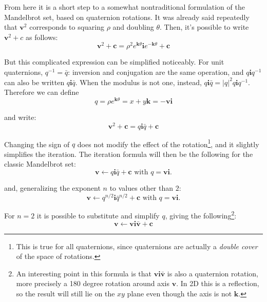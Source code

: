 \documentclass{article}
\let\vec\mathbf
\begin{document}
From here it is a short step to a somewhat nontraditional formulation of
the Mandelbrot set, based on quaternion rotations.  It was already said
repeatedly that $\vec{v}^2$ corresponds to squaring $\rho$ and doubling
$\theta$.  Then, it's possible to write $\vec{v}^2+c$ as follows:
\begin{equation*}
\vec{v}^2+\vec{c}=\rho^2 e^{\vec{k}\theta} \vec{i} e^{-\vec{k}\theta}+\vec{c}
\end{equation*}

But this complicated expression can be simplified noticeably.  For unit
quaternions, $q^{-1}=\bar q$: inversion and conjugation are the same
operation, and $q\vec{i}q^{-1}$ can also be written $q\vec{i}\bar
q$.  When the modulus is not one, instead, $q\vec{i}\bar q = |q|^2
q\vec{i}q^{-1}$.  Therefore we can define
\begin{equation*}
q = \rho e^{\vec{k}\theta} = x + y\vec{k} = -\vec{v}\vec{i}
\end{equation*}

\noindent
and write:
\begin{equation*}
\vec{v}^2+\vec{c}=q \vec{i} \bar q+\vec{c}
\end{equation*}

\noindent
Changing the sign of $q$ does not modify the effect of the
rotation\footnote{This is true for all quaternions, since quaternions
  are actually a \emph{double cover} of the space of rotations.}, and
it slightly simplifies the iteration.  The iteration formula will then be
the following for the classic Mandelbrot set:
\begin{equation*}
\vec{v}\leftarrow q \vec{i} \bar q+\vec{c}\text{ with }q=\vec{v}\vec{i}.
\end{equation*}

\noindent
and, generalizing the exponent $n$ to values other than $2$:
\begin{equation}
\label{eq:quat}
\vec{v}\leftarrow q^{n/2} \vec{i} \bar q^{n/2}+\vec{c}\text{ with }q=\vec{v}\vec{i}.
\end{equation}

\noindent
For $n=2$ it is possible to substitute and simplify $q$, giving
the following\footnote{An interesting point in this formula is that
  $\vec{v}\vec{i}\vec{\bar v}$ is also a quaternion rotation, more
  precisely a 180 degree rotation around axis $\vec{v}$.  In 2D this
  is a reflection, so the result will still lie on the $xy$ plane
  even though the axis is not $\vec{k}$.}:
\begin{equation}
\label{eq:coolness}
\vec{v}\leftarrow\vec{v} \vec{i} \vec{\bar v}+\vec{c}
\end{equation}
\end{document}
